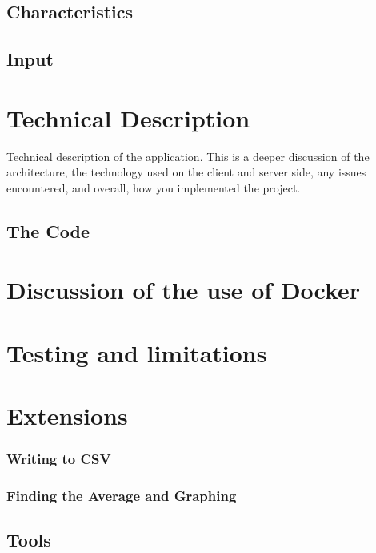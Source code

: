 \documentclass[12pt]{article}
\begin{document}
\subsection{Characteristics}




\subsection{Input}

\section{Technical Description}

Technical description of the application. This is a deeper discussion of the architecture,
the technology used on the client and server side, any issues encountered, and overall,
how you implemented the project.

\subsection{The Code}

\section{Discussion of the use of Docker}


\section{Testing and limitations} 


\section{Extensions}

\subsubsection{Writing to CSV}


\subsubsection{Finding the Average and Graphing}

\begin{itemize}[noitemsep]

\end{itemize}

\subsection{Tools}
\end{document}
